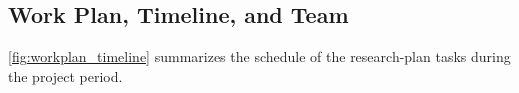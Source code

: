 
\subsection{Work Plan, Timeline, and Team} \label{sec:workplan}

\autoref{fig:workplan_timeline} summarizes the schedule of the research-plan tasks during the project period.

